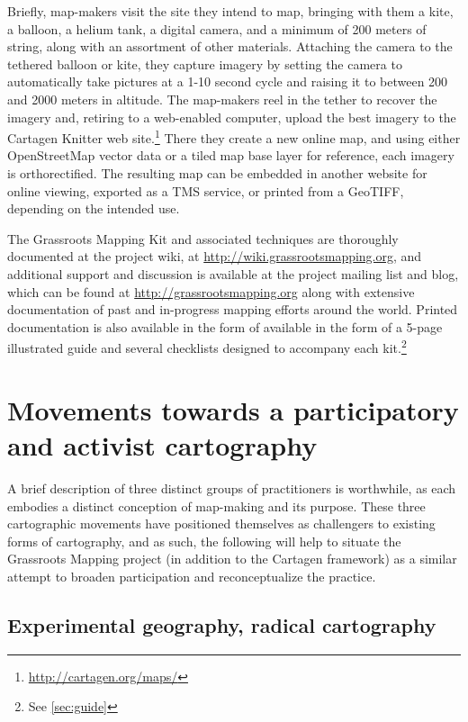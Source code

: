 \documentclass[11pt,oneside,notitlepage]{report}
\begin{document}
Briefly, map-makers visit the site they intend to map, bringing with them a kite, a balloon, a helium tank, a digital camera, and a minimum of 200 meters of string, along with an assortment of other materials. Attaching the camera to the tethered balloon or kite, they capture imagery by setting the camera to automatically take pictures at a 1-10 second cycle and raising it to between 200 and 2000 meters in altitude. The map-makers reel in the tether to recover the imagery and, retiring to a web-enabled computer, upload the best imagery to the Cartagen Knitter web site.\footnote{\url{http://cartagen.org/maps/}} There they create a new online map, and using either OpenStreetMap vector data or a tiled map base layer for reference, each imagery is orthorectified. The resulting map can be embedded in another website for online viewing, exported as a \ac{TMS} service, or printed from a \ac{GeoTIFF}, depending on the intended use. 

The Grassroots Mapping Kit and associated techniques are thoroughly documented at the project wiki, at \url{http://wiki.grassrootsmapping.org}, and additional support and discussion is available at the project mailing list and blog, which can be found at \url{http://grassrootsmapping.org} along with extensive documentation of past and in-progress mapping efforts around the world. Printed documentation is also available in the form of available in the form of a 5-page illustrated guide and several checklists designed to accompany each kit.\footnote{See \ref{sec:guide}}

\chapter{Movements towards a participatory and activist cartography}

A brief description of three distinct groups of practitioners is worthwhile, as each embodies a distinct conception of map-making and its purpose. These three cartographic movements have positioned themselves as challengers to existing forms of cartography, and as such, the following will help to situate the Grassroots Mapping project (in addition to the Cartagen framework) as a similar attempt to broaden participation and reconceptualize the practice. 

\section{Experimental geography, radical cartography}
\end{document}
